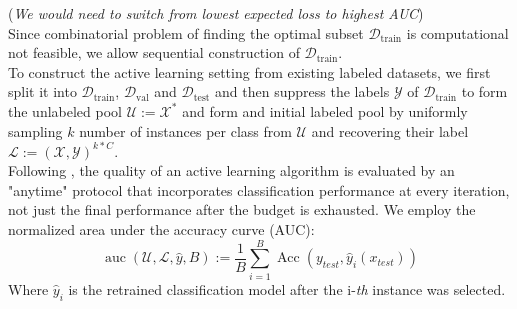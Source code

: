\documentclass[]{article}
\begin{document}
(\textit{We would need to switch from lowest expected loss to highest AUC}) \\
Since combinatorial problem of finding the optimal subset $\mathcal{D}_\text{train}$ is computational not feasible, we allow sequential construction of $\mathcal{D}_\text{train}$. \\
%
To construct the active learning setting from existing labeled datasets, we first split it into $\mathcal{D}_\text{train}$, $\mathcal{D}_\text{val}$ and $\mathcal{D}_\text{test}$ and then suppress the labels $\mathcal{Y}$ of $\mathcal{D}_\text{train}$ to form the unlabeled pool $\mathcal{U} := \mathcal{X}^*$ and form and initial labeled pool by uniformly sampling $k$ number of instances per class from $\mathcal{U}$ and recovering their label $\mathcal{L} := (\mathcal{X}, \mathcal{Y})^{k*C}$. \\
%
Following \cite{zhou2021towards}, the quality of an active learning algorithm is evaluated by an "anytime" protocol that incorporates classification performance at every iteration, not just the final performance after the budget is exhausted.
We employ the normalized area under the accuracy curve (AUC):
\begin{equation}\label{eq:auc}
	\operatorname{auc}(\mathcal{U}, \mathcal{L}, \hat y, B) := \frac{1}{B} \sum_{i=1}^{B} \operatorname{Acc}(y_{test}, \hat y_i(x_{test}))
\end{equation}
Where $\hat y_i$ is the retrained classification model after the i-\textit{th} instance was selected.
\end{document}
